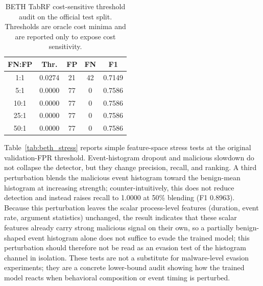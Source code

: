 \documentclass[10pt,journal,compsoc]{IEEEtran}
\begin{document}
\begin{table}[t]
\centering
\caption{BETH TabRF cost-sensitive threshold audit on the official test split. Thresholds are oracle cost minima and are reported only to expose cost sensitivity.}
\label{tab:beth_cost}
\begin{tabular}{ccccc}
\toprule
\textbf{FN:FP} & \textbf{Thr.} & \textbf{FP} & \textbf{FN} & \textbf{F1} \\
\midrule
1:1 & 0.0274 & 21 & 42 & 0.7149 \\
5:1 & 0.0000 & 77 & 0 & 0.7586 \\
10:1 & 0.0000 & 77 & 0 & 0.7586 \\
25:1 & 0.0000 & 77 & 0 & 0.7586 \\
50:1 & 0.0000 & 77 & 0 & 0.7586 \\
\bottomrule
\end{tabular}
\end{table}

Table~\ref{tab:beth_stress} reports simple feature-space stress tests at the original validation-FPR threshold. Event-histogram dropout and malicious slowdown do not collapse the detector, but they change precision, recall, and ranking. A third perturbation blends the malicious event histogram toward the benign-mean histogram at increasing strength; counter-intuitively, this does not reduce detection and instead raises recall to 1.0000 at 50\% blending (F1 0.8963). Because this perturbation leaves the scalar process-level features (duration, event rate, argument statistics) unchanged, the result indicates that these scalar features already carry strong malicious signal on their own, so a partially benign-shaped event histogram alone does not suffice to evade the trained model; this perturbation should therefore not be read as an evasion test of the histogram channel in isolation. These tests are not a substitute for malware-level evasion experiments; they are a concrete lower-bound audit showing how the trained model reacts when behavioral composition or event timing is perturbed.
\end{document}
